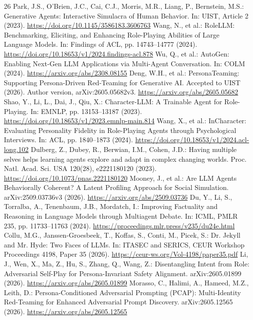 \documentclass{svproc}
\begin{document}
\begin{thebibliography}{26}
 Park, J.S., O'Brien, J.C., Cai, C.J., Morris, M.R., Liang, P., Bernstein, M.S.: Generative Agents: Interactive Simulacra of Human Behavior. In: UIST, Article 2 (2023). \url{https://doi.org/10.1145/3586183.3606763}
 Wang, N., et al.: RoleLLM: Benchmarking, Eliciting, and Enhancing Role-Playing Abilities of Large Language Models. In: Findings of ACL, pp. 14743--14777 (2024). \url{https://doi.org/10.18653/v1/2024.findings-acl.878}
 Wu, Q., et al.: AutoGen: Enabling Next-Gen LLM Applications via Multi-Agent Conversation. In: COLM (2024). \url{https://arxiv.org/abs/2308.08155}
 Deng, W.H., et al.: PersonaTeaming: Supporting Persona-Driven Red-Teaming for Generative AI. Accepted to UIST (2026). Author version, arXiv:2605.05682v3. \url{https://arxiv.org/abs/2605.05682}
 Shao, Y., Li, L., Dai, J., Qiu, X.: Character-LLM: A Trainable Agent for Role-Playing. In: EMNLP, pp. 13153--13187 (2023). \url{https://doi.org/10.18653/v1/2023.emnlp-main.814}
 Wang, X., et al.: InCharacter: Evaluating Personality Fidelity in Role-Playing Agents through Psychological Interviews. In: ACL, pp. 1840--1873 (2024). \url{https://doi.org/10.18653/v1/2024.acl-long.102}
 Dulberg, Z., Dubey, R., Berwian, I.M., Cohen, J.D.: Having multiple selves helps learning agents explore and adapt in complex changing worlds. Proc. Natl. Acad. Sci. USA 120(28), e2221180120 (2023). \url{https://doi.org/10.1073/pnas.2221180120}
 Mooney, J., et al.: Are LLM Agents Behaviorally Coherent? A Latent Profiling Approach for Social Simulation. arXiv:2509.03736v3 (2026). \url{https://arxiv.org/abs/2509.03736}
 Du, Y., Li, S., Torralba, A., Tenenbaum, J.B., Mordatch, I.: Improving Factuality and Reasoning in Language Models through Multiagent Debate. In: ICML, PMLR 235, pp. 11733--11763 (2024). \url{https://proceedings.mlr.press/v235/du24e.html}
 Collu, M.G., Janssen-Groesbeek, T., Koffas, S., Conti, M., Picek, S.: Dr. Jekyll and Mr. Hyde: Two Faces of LLMs. In: ITASEC and SERICS, CEUR Workshop Proceedings 4198, Paper 35 (2026). \url{https://ceur-ws.org/Vol-4198/paper35.pdf}
 Li, J., Wen, X., Ma, Z., Hu, S., Zhang, Q., Wang, Z.: Disentangling Intent from Role: Adversarial Self-Play for Persona-Invariant Safety Alignment. arXiv:2605.01899 (2026). \url{https://arxiv.org/abs/2605.01899}
 Morasso, C., Halimi, A., Hameed, M.Z., Leith, D.: Persona-Conditioned Adversarial Prompting (PCAP): Multi-Identity Red-Teaming for Enhanced Adversarial Prompt Discovery. arXiv:2605.12565 (2026). \url{https://arxiv.org/abs/2605.12565}

\end{thebibliography}
\end{document}
